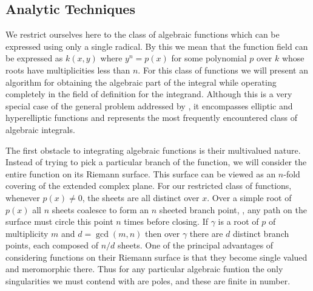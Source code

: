 \subsection{Analytic Techniques}

We restrict ourselves here to the class of algebraic functions
which can be expressed using only a single radical.  By this we mean
that the function field can be expressed as $k(x,y)$ where $y^n=p(x)$
for some polynomial $p$ over $k$ whose
roots have multiplicities less than $n$.  For this class of functions
we will present an algorithm for obtaining the algebraic part of the
integral while operating completely in the field of definition for the
integrand.  Although this is a very special case of the general 
problem addressed by {\Risch}, it encompasses elliptic and
hyperelliptic functions and represents the most frequently  encountered
class of algebraic integrals.

The first obstacle to integrating algebraic functions is their
multivalued nature.  Instead of trying to pick a particular branch
of the function, we will consider the entire function on its Riemann
surface.  This surface can be viewed as an $n$-fold covering of the
extended complex plane.  For our restricted class of functions, whenever
$p(x) \not= 0$, the sheets are all distinct over $x$.  Over a simple
root of $p(x)$
all $n$ sheets coalesce to form an $n$ sheeted branch point, \ie,
any path on the surface must circle this point $n$ times before
closing.  If $\gamma$ is a root of $p$ of multiplicity $m$ and $d=\gcd(m,n)$
then over $\gamma$ there are $d$ distinct branch points, each composed of
$n/d$ sheets.  One of the principal advantages of considering functions on
their Riemann surface is that they become single valued and meromorphic
there.  Thus for any particular algebraic funtion
the only singularities we must contend with are poles, and
these are finite in number.

